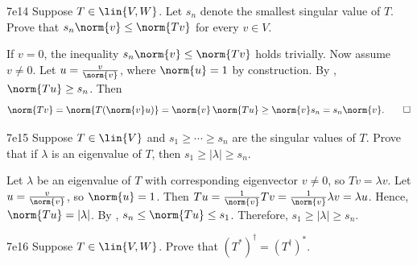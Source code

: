 \begin{exercise}{7e14}
    Suppose $T \in \lin{V, W}$.
    Let $s_n$ denote the smallest singular value of $T$.
    Prove that $s_n \norm{v} \leq \norm{Tv}$ for every $v \in V$.
\end{exercise}

\begin{sol}
    If $v = 0$, the inequality $s_n \norm{v} \leq \norm{Tv}$ holds trivially.
    Now assume $v \neq 0$.
    Let $u = \frac{v}{\norm{v}}$, where $\norm{u} = 1$ by construction.
    By , $\norm{Tu} \geq s_n$.
    Then
    \[
        \norm{Tv} = \norm{T(\norm{v} u)} = \norm{v}\,\norm{Tu} \geq \norm{v} s_n = s_n \norm{v}. \qedhere
    \]
\end{sol}

\begin{exercise}{7e15}
    Suppose $T \in \lin{V}$ and $s_1 \geq \cdots \geq s_n$ are the singular values of $T$.
    Prove that if $\lambda$ is an eigenvalue of $T$, then $s_1 \geq |\lambda| \geq s_n$.
\end{exercise}

\begin{sol}
    Let $\lambda$ be an eigenvalue of $T$ with corresponding eigenvector $v \neq 0$, so $Tv = \lambda v$.
    Let $u = \frac{v}{\norm{v}}$, so $\norm{u} = 1$.
    Then $Tu = \frac{1}{\norm{v}} Tv = \frac{1}{\norm{v}} \lambda v = \lambda u$.
    Hence, $\norm{Tu} = |\lambda|$.
    By , $s_n \leq \norm{Tu} \leq s_1$.
    Therefore, $s_1 \geq |\lambda| \geq s_n$.
\end{sol}

\begin{exercise}{7e16}
    Suppose $T \in \lin{V, W}$.
    Prove that $(T^\ast)^\dagger = (T^\dagger)^\ast$.

\end{exercise}

